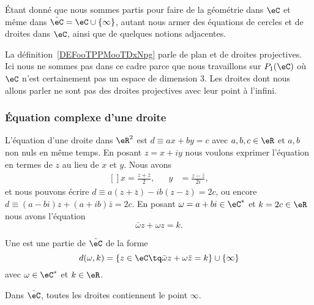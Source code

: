 Étant donné que nous sommes partis pour faire de la géométrie dans \( \eC\) et même dans \( \hat \eC=\eC\cup \{ \infty \}\), autant nous armer des équations de cercles et de droites dans \( \eC\), ainsi que de quelques notions adjacentes.

\begin{remark}
    La définition~\ref{DEFooTPPMooTDxNpg} parle de plan et de droites projectives. Ici nous ne sommes pas dans ce cadre parce que nous travaillons sur \( P_1(\eC)\) où \( \eC\) n'est certainement pas un espace de dimension \( 3\). Les droites dont nous allons parler ne sont pas des droites projectives avec leur point à l'infini.
\end{remark}

\subsubsection{Équation complexe d'une droite}

L'équation d'une droite dans \( \eR^2\) est \( d\equiv ax+by=c\) avec \( a,b,c\in \eR\) et \( a,b\) non nuls en même temps. En posant \( z=x+iy\) nous voulons exprimer l'équation en termes de \( z\) au lieu de \( x\) et \( y\). Nous avons\cite{ooWNHWooGUnivi}
\begin{equation}
    \begin{aligned}[]
        x=\frac{ z+\bar z }{2},&&y&=\frac{ z-\bar z }{ 2i },
    \end{aligned}
\end{equation}
et nous pouvons écrire \( d\equiv a(z+\bar z)-ib(z-\bar z)=2c\), ou encore \( d\equiv (a-bi)z+(a+ib)\bar z=2c\). En posant \( \omega=a+bi\in \eC^*\) et \( k=2c\in \eR\) nous avons l'équation
\begin{equation}        \label{EQooPRCPooVvrHME}
    \bar \omega z+\omega z=k.
\end{equation}

\begin{definition}      \label{DEFooAQSMooWNOzAI}
    Une  est une partie de \( \hat\eC\) de la forme
    \begin{equation}
        d(\omega,k)=\{ z\in \eC\tq \bar\omega z+\omega\bar z=k \}\cup\{ \infty \}
    \end{equation}
    avec \( \omega\in \eC^*\) et \( k\in \eR\).
\end{definition}
Dans \( \hat \eC\), toutes les droites contiennent le point \( \infty\).

